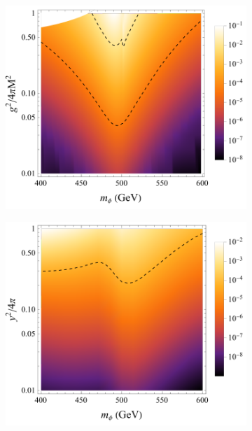 \documentclass[11pt]{article}
\theoremstyle{definition}
\theoremstyle{remark}
\begin{document}
	\begin{figure}[h]
		\centering
		\begin{subfigure}{0.4\textwidth}
			\centering
			\includegraphics[width=0.9\linewidth]{scalar_0GeV.pdf}
			\caption{}
			\label{fig:luminosity_ratio_sf:scalar}
		\end{subfigure}
		\begin{subfigure}{0.4\textwidth}
			\centering
			\includegraphics[width=0.9\linewidth]{fermion_0GeV.pdf}
			\caption{}
			\label{fig:luminosity_ratio_sf:fermion}
		\end{subfigure}
		\captionsetup{width=.9\linewidth}

\end{figure}
\end{document}
